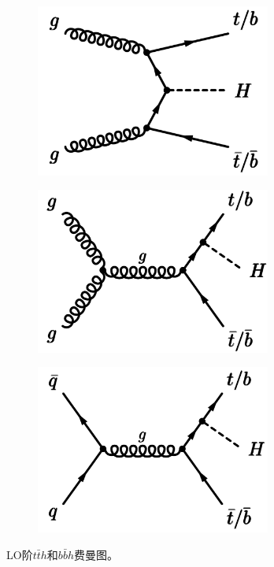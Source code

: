 \begin{figure}[h]
\centering
 \begin{subfigure}[b]{0.33\textwidth}
  \includegraphics[width=0.85\textwidth]{fig/diagram_tth1_LO.png}
  \caption{}
 \end{subfigure}
 \begin{subfigure}[b]{0.33\textwidth}
  \includegraphics[width=0.85\textwidth]{fig/diagram_tth2_LO.png}
  \caption{}
 \end{subfigure}
 \begin{subfigure}[b]{0.33\textwidth}
  \includegraphics[width=0.85\textwidth]{fig/diagram_tth3_LO.png}
  \caption{}
 \end{subfigure}
\caption{LO阶$t\bar{t}h$和$b\bar{b}h$费曼图。}
\label{fig:diagram_tth}
\end{figure}

